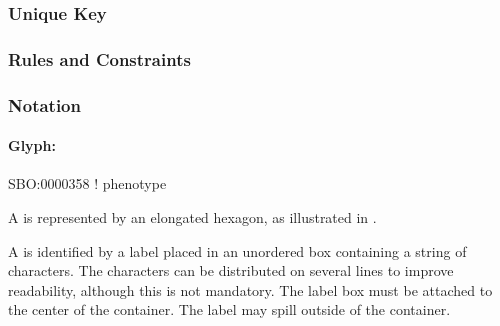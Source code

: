 \subsubsection{Unique Key}

\begin{logicalkey}
\item {}
\item {}
\end{logicalkey}

\subsubsection{Rules and Constraints}

\begin{valrules}
\end{valrules}


\subsubsection{Notation}

\paragraph{Glyph: }
\label{sec:techref:phenotype}

\begin{glyphDescription}

\glyphSboTerm SBO:0000358 ! phenotype

\glyphContainer A  is represented by an elongated
hexagon, as illustrated in .

\glyphLabel A  is identified by a label placed in an
unordered box containing a string of characters.  The characters can be
distributed on several lines to improve readability, although this is not
mandatory.  The label box must be attached to the center of the
 container.  The label may spill outside of the container.
\end{glyphDescription}

